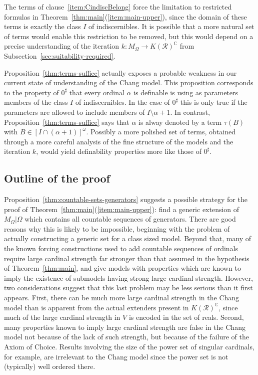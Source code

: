 \documentclass[
twoside,
]{article}
\theoremstyle{definition}
\theoremstyle{remark}
\newcommand{\ords}{\Omega}
\newcommand\reals{\mathcal{R}}
\newcommand{\RK}{K(\reals)}
\newcommand{\cut}{{\vert}}
\newcommand\chang{\mathbb{C}}
\begin{document}
The terms of clause~\ref{item:CindiscBelong} force the limitation 
to restricted formulas in
Theorem~\ref{thm:main}(\ref{item:main-upper}), since the domain of these terms is exactly the
class $I$ of indiscernibles.  It is possible that a more natural set
of terms would enable this restriction to be removed, but this would
depend on a precise understanding of the iteration $k\colon M_\ords\to
K(\reals)^{\chang}$  from Subsection~\ref{sec:suitability-required}.

Proposition~\ref{thm:terms-suffice} actually exposes a probable
weakness in our current state of understanding of the Chang model.   This proposition
corresponds to the property of  $0^{\sharp}$ that every ordinal $\alpha$
is definable is using as parameters  members of the class $I$ of
indiscernibles.    In the case of $0^{\sharp}$ this is only true if
the parameters are allowed to include members of $I\setminus\alpha+1$.
In contrast, Proposition~\ref{thm:terms-suffice} says that $\alpha$
is alway denoted by a term $\tau(B)$ with
$B\in[I\cap(\alpha+1)]^{\omega}$.    Possibly a more polished set of
terms, obtained  through a more careful
analysis of  the fine structure of the models and the iteration
$k$,  would yield definability
properties more like those of  $0^{\sharp}$. 

\subsection{Outline of the proof}
\label{sec:proof-start}

Proposition~\ref{thm:countable-sets-generators} suggests  a possible
strategy for the proof of
Theorem~\ref{thm:main}(\ref{item:main-upper}):  find  a generic
extension of $M_{\ords}\cut\ords$ which  contains all 
countable sequences of generators.     There are good reasons
why this is likely to be impossible, beginning with the problem of
actually constructing a generic set for a class sized model.  
Beyond that, many of the known forcing constructions used to add countable sequences of
ordinals require large cardinal strength far stronger than that
assumed in the hypothesis of Theorem~\ref{thm:main}, and give models with
properties which are known to imply the existence of submodels having strong
large cardinal strength.
However, two considerations suggest that this last problem may be less
serious than it first  appears.    First,  there can be  much more large cardinal strength in
the Chang model than is apparent from the actual extenders present in $\RK^{\chang}$, 
since much of the large cardinal strength in $V$ is
encoded in the set of reals.      Second, 
many properties known to imply large cardinal strength
are false in the Chang model not because of the lack of such
strength, but because of the failure of the
Axiom of Choice.
Results involving the size of the power set of singular cardinals, for
example, are irrelevant to the Chang model since the power set is not
(typically) well ordered there.
\end{document}
